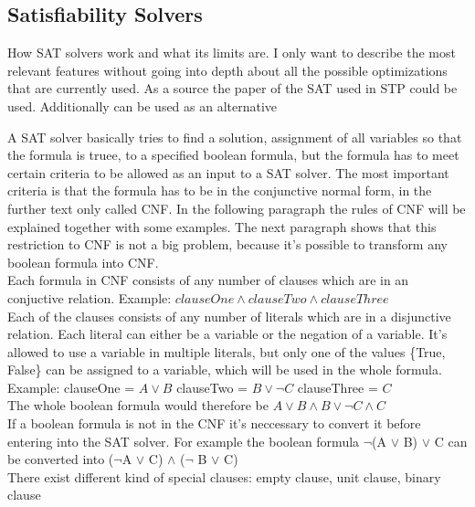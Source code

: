 \subsection{Satisfiability Solvers}
How SAT solvers work and what its limits are.
I only want to describe the most relevant features without going into depth about all the possible optimizations that are currently used.
As a source the paper of the SAT used in STP \cite{10.1007/978-3-540-24605-3_37} could be used. Additionally \cite{Gomes2008SatisfiabilityS} can be used as an alternative

A SAT solver basically tries to find a solution, assignment of all variables so that the formula is truee, to a specified boolean formula, but the formula has to meet certain criteria to be allowed as an input to a SAT solver. The most important criteria is that the formula has to be in the conjunctive normal form, in the further text only called CNF. In the following paragraph the rules of CNF will be explained together with some examples. The next paragraph shows that this restriction to CNF is not a big problem, because it's possible to transform any boolean formula into CNF.\\
Each formula in CNF consists of any number of clauses which are in an conjuctive relation. Example: $clauseOne \land clauseTwo \land clauseThree$\\
Each of the clauses consists of any number of literals which are in a disjunctive relation. Each literal can either be a variable or the negation of a variable. It's allowed to use a variable in multiple literals, but only one of the values \{True, False\} can be assigned to a variable, which will be used in the whole formula. Example: clauseOne = $A \lor B$ clauseTwo = $B \lor \lnot C$ clauseThree = $C$\\
The whole boolean formula would therefore be $A \lor B \land B \lor \lnot C \land C$\\
If a boolean formula is not in the CNF it's neccessary to convert it before entering into the SAT solver. For example the boolean formula $\lnot$(A $\lor$ B) $\lor$ C can be converted into ($\lnot$A $\lor$ C) $\land$ ($\lnot$ B $\lor$ C)\\
There exist different kind of special clauses: empty clause, unit clause, binary clause